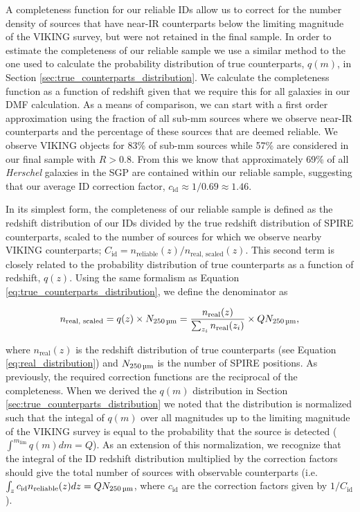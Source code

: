 A completeness function for our reliable IDs allow us to correct for the number density of sources that have near-IR counterparts below the limiting magnitude of the VIKING survey, but were not retained in the final sample. In order to estimate the completeness of our reliable sample we use a similar method to the one used to calculate the probability distribution of true counterparts, $q(m)$, in Section \ref{sec:true_counterparts_distribution}. We calculate the completeness function as a function of redshift given that we require this for all galaxies in our DMF calculation. As a means of comparison, we can start with a first order approximation using the fraction of all sub-mm sources where we observe near-IR counterparts and the percentage of these sources that are deemed reliable. We observe VIKING objects for 83\% of sub-mm sources while 57\% are considered in our final sample with $R > 0.8$. From this we know that approximately 69\% of all \textit{Herschel} galaxies in the SGP are contained within our reliable sample, suggesting that our average ID correction factor, $c_{\textrm{id}} \approx 1/0.69 \approx 1.46$.

In its simplest form, the completeness of our reliable sample is defined as the redshift distribution of our IDs divided by the true redshift distribution of SPIRE counterparts, scaled to the number of sources for which we observe nearby VIKING counterparts; $C_{\textrm{id}} = n_{\textrm{reliable}}(z)/n_{\textrm{real, scaled}}(z)$. This second term is closely related to the probability distribution of true counterparts as a function of redshift, $q(z)$. Using the same formalism as Equation \ref{eq:true_counterparts_distribution}, we define the denominator as

\begin{equation}
    n_{\textrm{real, scaled}} = q(z)\times N_{\textrm{250\,\micron}} = \frac{n_{\textrm{real}}(z)}{\sum_{z_i}n_{\textrm{real}}(z_i)}\times QN_{\textrm{250\,\micron}},
    \label{eq:n_real_scaled}
\end{equation}

\noindent where $n_{\textrm{real}}(z)$ is the redshift distribution of true counterparts (see Equation \ref{eq:real_distribution}) and $N_{\textrm{250\,\micron}}$ is the number of SPIRE positions. As previously, the required correction functions are the reciprocal of the completeness. When we derived the $q(m)$ distribution in Section \ref{sec:true_counterparts_distribution} we noted that the distribution is normalized such that the integal of $q(m)$ over all magnitudes up to the limiting magnitude of the VIKING survey is equal to the probability that the source is detected ($\int^{m_\textrm{lim}} q(m) dm = Q$). As an extension of this normalization, we recognize that the integral of the ID redshift distribution multiplied by the correction factors should give the total number of sources with observable counterparts (i.e. $\int_z c_{\textrm{id}} n_{\textrm{reliable}}(z) dz = QN_{\textrm{250\,\micron}}$, where $c_{\textrm{id}}$ are the correction factors given by $1/C_{\textrm{id}}$).

